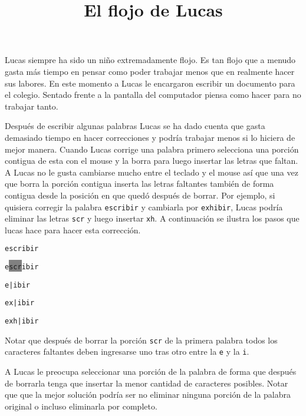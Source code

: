 \documentclass{oci}
\title{El flojo de Lucas}
\begin{document}
\begin{problemDescription}
  Lucas siempre ha sido un niño extremadamente flojo.
  Es tan flojo que a menudo gasta más tiempo en pensar como poder trabajar menos
  que en realmente hacer sus labores.
  En este momento a Lucas le encargaron escribir un documento para el colegio.
  Sentado frente a la pantalla del computador piensa como hacer para no trabajar
  tanto.

  Después de escribir algunas palabras Lucas se ha dado cuenta que gasta
  demasiado tiempo en hacer correcciones y podría trabajar menos si lo hiciera
  de mejor manera.
  Cuando Lucas corrige una palabra primero selecciona una porción contigua de
  esta con el mouse y la borra para luego insertar las letras que faltan.
  A Lucas no le gusta cambiarse mucho entre el teclado y el mouse así que una
  vez que borra la porción contigua inserta las letras faltantes también de
  forma contigua desde la posición en que quedó después de borrar.
  Por ejemplo, si quisiera corregir la palabra \texttt{escribir} y cambiarla por
  \texttt{exhibir}, Lucas podría eliminar las letras \texttt{scr} y luego
  insertar \texttt{xh}.
  A continuación se ilustra los pasos que lucas hace para hacer esta corrección.

  \texttt{escribir}

  \texttt{e\colorbox{gray}{\hspace{-0.24em}scr\hspace{-0.24em}}ibir}

  \texttt{e{\color{gray}\hspace{-0.2em}|\hspace{-0.24em}}ibir}

  \texttt{ex{\color{gray}\hspace{-0.2em}|\hspace{-0.24em}}ibir}

  \texttt{exh{\color{gray}\hspace{-0.2em}|\hspace{-0.24em}}ibir}

  Notar que después de borrar la porción \texttt{scr} de la primera palabra
  todos los caracteres faltantes deben ingresarse uno tras otro entre la
  \texttt{e} y la \texttt{i}.

  A Lucas le preocupa seleccionar una porción de la palabra de forma que después
  de borrarla tenga que insertar la menor cantidad de caracteres posibles.
  Notar que que la mejor solución podría ser no eliminar ninguna porción de
  la palabra original o incluso eliminarla por completo.


\end{problemDescription}
\end{document}

